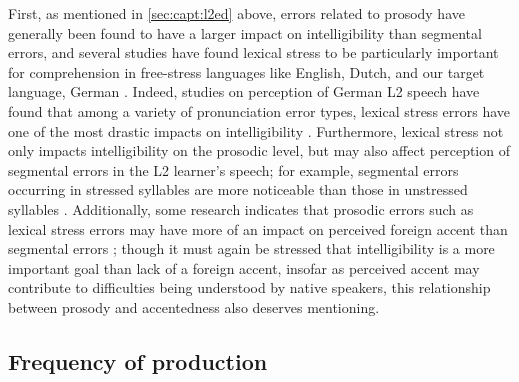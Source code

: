 	First, as mentioned in \cref{sec:capt:l2ed} above, errors related to prosody have generally been found to have a larger impact on intelligibility than segmental errors, and several studies have found lexical stress to be particularly important for comprehension in free-stress languages like English, Dutch, and our target language, German \citep{Hirschfeld1994,Cutler2005}.
	Indeed, studies on perception of German L2 speech have found that among a variety of pronunciation error types, lexical stress errors have one of the most drastic impacts on intelligibility \citep{Hirschfeld1994}.
%
		Furthermore, lexical stress not only impacts intelligibility on the prosodic level, but may also affect perception of segmental errors in the L2 learner's speech; for example, segmental errors occurring in stressed syllables are more noticeable than those in unstressed syllables \citep{Cutler2005}.
		Additionally, some research indicates that prosodic errors such as lexical stress errors may have more of an impact on perceived foreign accent than segmental errors \citep{Witt2012}; though it must again be stressed that intelligibility is a more important goal than lack of a foreign accent, insofar as perceived accent may contribute to difficulties being understood by native speakers, this relationship between prosody and accentedness also deserves mentioning.

		\subsection{Frequency of production}
		\label{sec:targeting:frequency}

